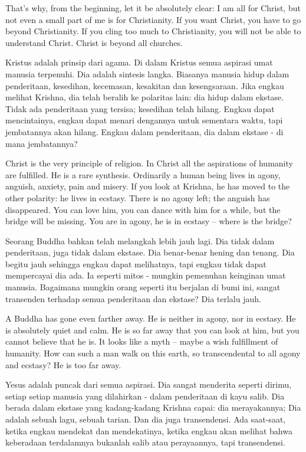 \english
That's why, from the beginning, let it be absolutely clear: I am all for Christ, but not even a small part of me is for Christianity. If you want Christ, you have to go beyond Christianity. If you cling too much to Christianity, you will not be able to understand Christ. Christ is beyond all churches.

\bahasa
Kristus adalah prinsip dari agama. Di dalam Kristus semua aspirasi umat manusia terpenuhi. Dia adalah sintesis langka. Biasanya manusia hidup dalam penderitaan, kesedihan, kecemasan, kesakitan dan kesengsaraan. Jika engkau melihat Krishna, dia telah beralih ke polaritas lain: dia hidup dalam ekstase. Tidak ada penderitaan yang tersisa; kesedihan telah hilang. Engkau dapat mencintainya, engkau dapat menari dengannya untuk sementara waktu, tapi jembatannya akan hilang. Engkau dalam penderitaan, dia dalam ekstase - di mana jembatannya?

\english
Christ is the very principle of religion. In Christ all the aspirations of humanity are fulfilled. He is a rare synthesis. Ordinarily a human being lives in agony, anguish, anxiety, pain and misery. If you look at Krishna, he has moved to the other polarity: he lives in ecstasy. There is no agony left; the anguish has disappeared. You can love him, you can dance with him for a while, but the bridge will be missing. You are in agony, he is in ecstasy -- where is the bridge?

\bahasa
Seorang Buddha bahkan telah melangkah lebih jauh lagi. Dia tidak dalam penderitaan, juga tidak dalam ekstase. Dia benar-benar hening dan tenang. Dia begitu jauh sehingga engkau dapat melihatnya, tapi engkau tidak dapat mempercayai dia ada. Ia seperti mitos - mungkin pemenuhan keinginan umat manusia. Bagaimana mungkin orang seperti itu berjalan di bumi ini, sangat transenden terhadap semua penderitaan dan ekstase? Dia terlalu jauh.

\english
A Buddha has gone even farther away. He is neither in agony, nor in ecstasy. He is absolutely quiet and calm. He is so far away that you can look at him, but you cannot believe that he is. It looks like a myth -- maybe a wish fulfillment of humanity. How can such a man walk on this earth, so transcendental to all agony and ecstasy? He is too far away.

\bahasa
Yesus adalah puncak dari semua aspirasi. Dia sangat menderita seperti dirimu, setiap setiap manusia yang dilahirkan - dalam penderitaan di kayu salib. Dia berada dalam ekstase yang kadang-kadang Krishna capai: dia merayakannya; Dia adalah sebuah lagu, sebuah tarian. Dan dia juga transendensi. Ada saat-saat, ketika engkau mendekat dan mendekatinya, ketika engkau akan melihat bahwa keberadaan terdalamnya bukanlah salib atau perayaannya, tapi transendensi.

